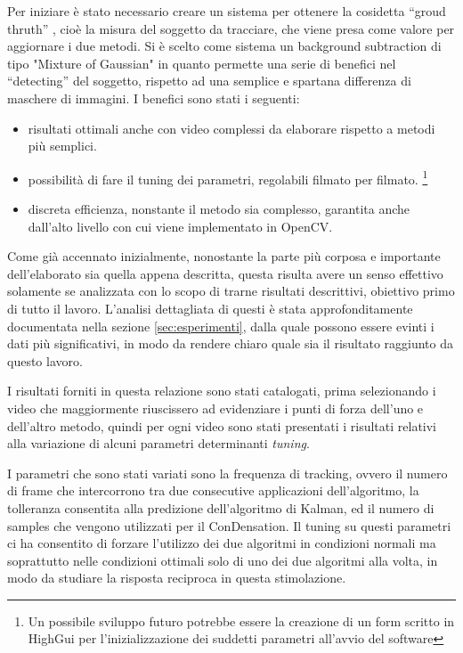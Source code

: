 Per iniziare è stato necessario creare un sistema per ottenere la cosidetta ``groud thruth'' , cioè la misura del soggetto da tracciare, che viene presa come valore per aggiornare i due metodi.
Si è scelto come sistema un background subtraction di tipo "Mixture of Gaussian" in quanto permette una serie di benefici nel ``detecting'' del soggetto, rispetto ad una semplice e spartana differenza di maschere di immagini. I benefici sono stati i seguenti:

\begin{itemize}
\item risultati ottimali anche con video complessi da elaborare rispetto a metodi più semplici.
\item possibilità di fare il tuning dei parametri, regolabili filmato per filmato. \footnote{Un possibile sviluppo futuro potrebbe essere la creazione di un form scritto in HighGui per l'inizializzazione dei suddetti parametri all'avvio del software}
\item discreta efficienza, nonstante il metodo sia complesso, garantita anche dall'alto livello con cui viene implementato in OpenCV.
\end{itemize}

Come già accennato inizialmente, nonostante la parte più corposa e importante dell'elaborato sia quella appena descritta, questa risulta avere un senso effettivo solamente se analizzata con lo scopo di trarne risultati descrittivi, obiettivo primo di tutto il lavoro. L'analisi dettagliata di questi è stata approfonditamente documentata nella sezione \ref{sec:esperimenti}, dalla quale possono essere evinti i dati più significativi, in modo da rendere chiaro quale sia il risultato raggiunto da questo lavoro. 

I risultati forniti in questa relazione sono stati catalogati, prima selezionando i video che maggiormente riuscissero ad evidenziare i punti di forza dell'uno e dell'altro metodo, quindi per ogni video sono stati presentati i risultati relativi alla variazione di alcuni parametri determinanti \emph{tuning}. 

I parametri che sono stati variati sono la frequenza di tracking, ovvero il numero di frame che intercorrono tra due consecutive applicazioni dell'algoritmo, la tolleranza consentita alla predizione dell'algoritmo di Kalman, ed il numero di samples che vengono utilizzati per il ConDensation. Il tuning su questi parametri ci ha consentito di forzare l'utilizzo dei due algoritmi in condizioni normali ma soprattutto nelle condizioni ottimali solo di uno dei due algoritmi alla volta, in modo da studiare la risposta reciproca in questa stimolazione.

